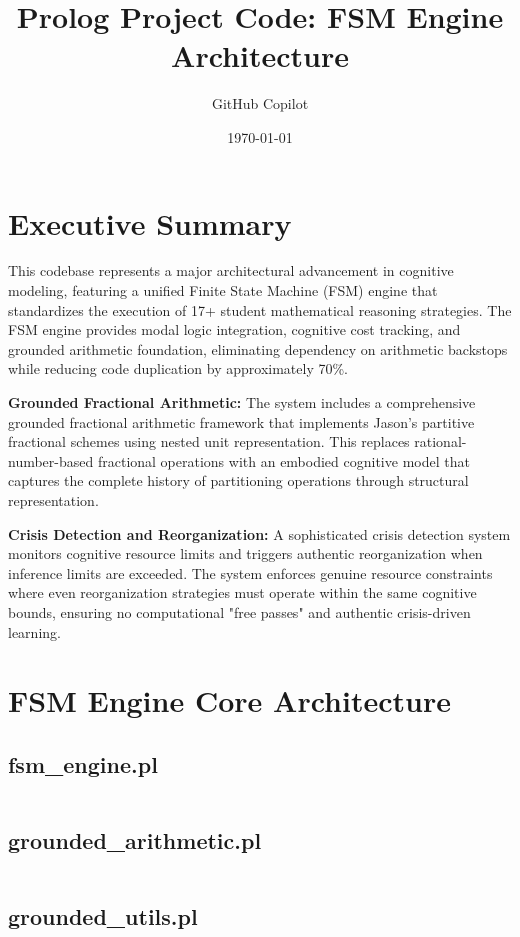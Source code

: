 \documentclass{article}
\title{Prolog Project Code: FSM Engine Architecture}
\author{GitHub Copilot}
\date{\today}
\begin{document}
\maketitle

\section*{Executive Summary}
This codebase represents a major architectural advancement in cognitive modeling, featuring a unified Finite State Machine (FSM) engine that standardizes the execution of 17+ student mathematical reasoning strategies. The FSM engine provides modal logic integration, cognitive cost tracking, and grounded arithmetic foundation, eliminating dependency on arithmetic backstops while reducing code duplication by approximately 70\%.

\textbf{Grounded Fractional Arithmetic:} The system includes a comprehensive grounded fractional arithmetic framework that implements Jason's partitive fractional schemes using nested unit representation. This replaces rational-number-based fractional operations with an embodied cognitive model that captures the complete history of partitioning operations through structural representation.

\textbf{Crisis Detection and Reorganization:} A sophisticated crisis detection system monitors cognitive resource limits and triggers authentic reorganization when inference limits are exceeded. The system enforces genuine resource constraints where even reorganization strategies must operate within the same cognitive bounds, ensuring no computational "free passes" and authentic crisis-driven learning.

\tableofcontents
\newpage

\section{FSM Engine Core Architecture}
\subsection{fsm\_engine.pl}
\inputminted{prolog}{fsm_engine.pl}
\subsection{grounded\_arithmetic.pl}
\inputminted{prolog}{grounded_arithmetic.pl}
\subsection{grounded\_utils.pl}
\inputminted{prolog}{grounded_utils.pl}
\end{document}
